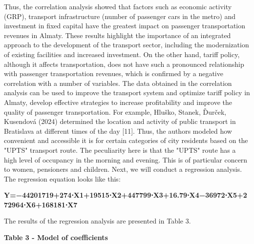 Thus, the correlation analysis showed that factors such as economic
activity (GRP), transport infrastructure (number of passenger cars in
the metro) and investment in fixed capital have the greatest impact on
passenger transportation revenues in Almaty. These results highlight the
importance of an integrated approach to the development of the transport
sector, including the modernization of existing facilities and increased
investment. On the other hand, tariff policy, although it affects
transportation, does not have such a pronounced relationship with
passenger transportation revenues, which is confirmed by a negative
correlation with a number of variables. The data obtained in the
correlation analysis can be used to improve the transport system and
optimize tariff policy in Almaty, develop effective strategies to
increase profitability and improve the quality of passenger
transportation. For example, Hluško, Stanek, Ďurček, Kusendová (2024)
determined the location and activity of public transport in Bratislava
at different times of the day {[}11{]}. Thus, the authors modeled how
convenient and accessible it is for certain categories of city residents
based on the "UPTS" transport route. The peculiarity here is that the
"UPTS" route has a high level of occupancy in the morning and evening.
This is of particular concern to women, pensioners and children. Next,
we will conduct a regression analysis. The regression equation looks
like this:

{\bfseries Y=−44201719+274⋅X1\hspace{0pt}+19515⋅X2\hspace{0pt}+447799⋅X3\hspace{0pt}+16.79⋅X4\hspace{0pt}−36972⋅X5\hspace{0pt}+272964⋅X6\hspace{0pt}+168181⋅X7\hspace{0pt}}

The results of the regression analysis are presented in Table 3.

{\bfseries Table 3 - Model of coefficients}

